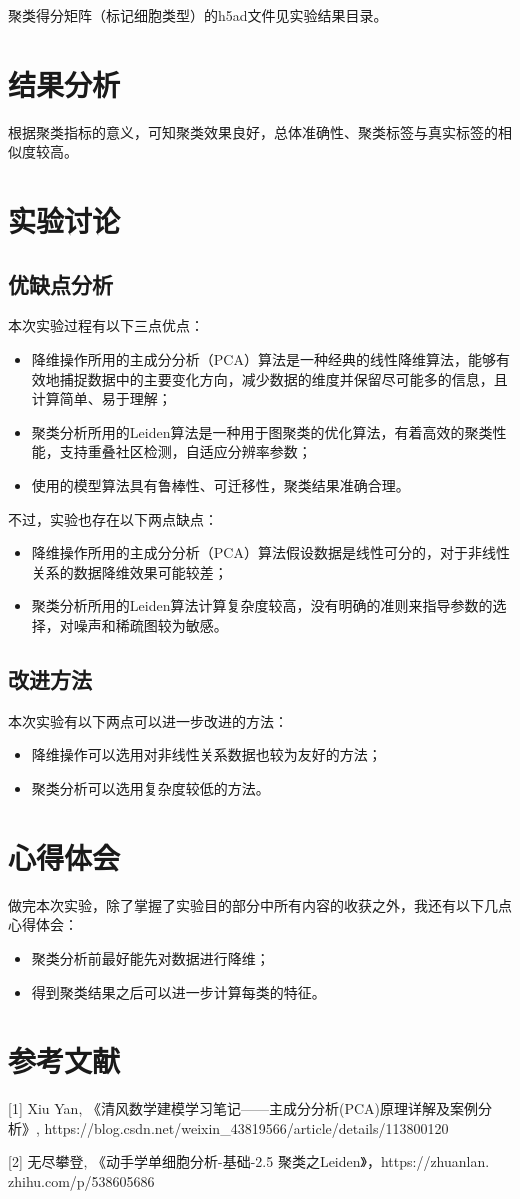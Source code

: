 \documentclass {article}
\begin{document}
	聚类得分矩阵（标记细胞类型）的h5ad文件见实验结果目录。
	
	\section{结果分析}
	根据聚类指标的意义，可知聚类效果良好，总体准确性、聚类标签与真实标签的相似度较高。
	
	\section{实验讨论}
	\subsection{优缺点分析}
	本次实验过程有以下三点优点：
	\begin{itemize}
		\item 降维操作所用的主成分分析（PCA）算法是一种经典的线性降维算法，能够有效地捕捉数据中的主要变化方向，减少数据的维度并保留尽可能多的信息，且计算简单、易于理解；
		\item 聚类分析所用的Leiden算法是一种用于图聚类的优化算法，有着高效的聚类性能，支持重叠社区检测，自适应分辨率参数；
		\item 使用的模型算法具有鲁棒性、可迁移性，聚类结果准确合理。
	\end{itemize}
	
	不过，实验也存在以下两点缺点：
	\begin{itemize}
		\item 降维操作所用的主成分分析（PCA）算法假设数据是线性可分的，对于非线性关系的数据降维效果可能较差；
		\item 聚类分析所用的Leiden算法计算复杂度较高，没有明确的准则来指导参数的选择，对噪声和稀疏图较为敏感。
	\end{itemize}
	
	\subsection{改进方法}
	本次实验有以下两点可以进一步改进的方法：
	\begin{itemize}
		\item 降维操作可以选用对非线性关系数据也较为友好的方法；
		\item 聚类分析可以选用复杂度较低的方法。
	\end{itemize}
	
	\section{心得体会}
	做完本次实验，除了掌握了实验目的部分中所有内容的收获之外，我还有以下几点心得体会：
	\begin{itemize}
		\item 聚类分析前最好能先对数据进行降维；
		\item 得到聚类结果之后可以进一步计算每类的特征。
	\end{itemize}
	
	\section{参考文献}
	[1] Xiu Yan, 《清风数学建模学习笔记——主成分分析(PCA)原理详解及案例分析》, https://blog.csdn.net/weixin\_43819566/article/details/113800120
	
	[2] 无尽攀登, 《动手学单细胞分析-基础-2.5 聚类之Leiden》，https://zhuanlan.\\zhihu.com/p/538605686
	
\end{document}
